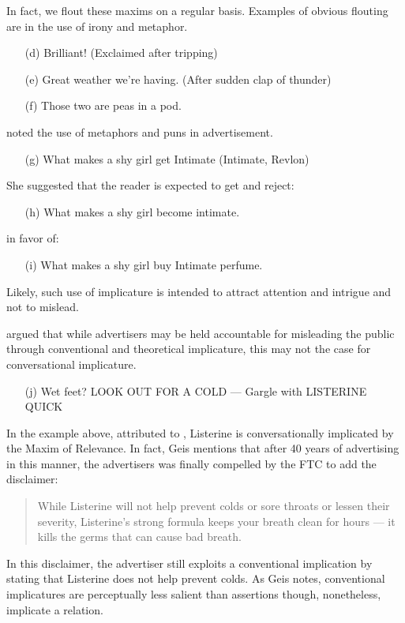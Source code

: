 In fact, we flout these maxims on a regular basis. Examples of obvious flouting are in the use of irony and metaphor. 
\begin{itemize}
\item[(d)] Brilliant! (Exclaimed after tripping)
\item[(e)] Great weather we're having. (After sudden clap of thunder)
\item[(f)] Those two are peas in a pod.
\end{itemize}
\cite{Tanaka:1999tq} noted the use of metaphors and puns in advertisement.
\begin{itemize}
\item[(g)] What makes a shy girl get Intimate (Intimate, Revlon) \citep[p.104]{Tanaka:1999tq}
\end{itemize}
She suggested that the reader is expected to get and reject:
\begin{itemize}
\item[(h)] What makes a shy girl become intimate.
\end{itemize}
in favor of:
\begin{itemize}
\item[(i)] What makes a shy girl buy Intimate perfume.
\end{itemize}
Likely, such use of implicature is intended to attract attention and intrigue and not to mislead. 

\cite{Geis:1982uf} argued that while advertisers may be held accountable for misleading the public through conventional and theoretical implicature, this may not the case for conversational implicature.
\begin{itemize}
\item[(j)] Wet feet? LOOK OUT FOR A COLD --- Gargle with LISTERINE QUICK \cite[p. 49]{Geis:1982uf}
\end{itemize}
In the example above, attributed to \cite{clark1944advertising}, Listerine is conversationally implicated by the Maxim of Relevance. In fact, Geis mentions that after 40 years of advertising in this manner, the advertisers was finally compelled by the FTC to add the disclaimer:

\begin{quote}
While Listerine will not help prevent colds or sore throats or lessen their severity, Listerine's strong formula keeps your breath clean for hours --- it kills the germs that can cause bad breath.
\end{quote}

In this disclaimer, the advertiser still exploits a conventional implication by stating that Listerine does not help prevent colds. As Geis notes, conventional implicatures are perceptually less salient than assertions though, nonetheless, implicate a relation.


